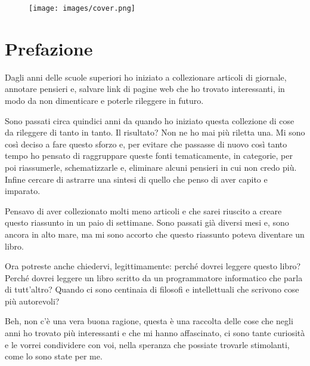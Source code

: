 \documentclass[12pt]{book} %
\date{2024-04-09}
\begin{document}
\begin{figure}[htbp]
    \centering
    \texttt{[image: images/cover.png]}
    \vspace{-\baselineskip} %
\end{figure}


\thispagestyle{empty}
\tableofcontents %
\markboth{}{}    %
\thispagestyle{empty}

\clearpage\section{Prefazione}
Dagli anni delle scuole superiori ho iniziato a collezionare articoli di giornale, annotare pensieri e, salvare link di
pagine web che ho trovato interessanti, in modo da non dimenticare e poterle rileggere in futuro.

Sono passati circa quindici anni da quando ho iniziato questa collezione di cose da rileggere di tanto in tanto. Il
risultato? Non ne ho mai più riletta una. Mi sono così deciso a fare questo sforzo e, per evitare che passasse di
nuovo così tanto tempo ho pensato di raggruppare queste fonti tematicamente, in categorie, per poi riassumerle,
schematizzarle e, eliminare alcuni pensieri in cui non credo più. Infine cercare di astrarre una sintesi di quello che
penso di aver capito e imparato. 

Pensavo di aver collezionato molti meno articoli e che sarei riuscito a creare questo riassunto in un paio di settimane.
Sono passati già diversi mesi e, sono ancora in alto mare, ma mi sono accorto che questo riassunto poteva diventare un
libro.

Ora potreste anche chiedervi, legittimamente: perché dovrei leggere questo libro? Perché dovrei leggere un libro scritto
da un programmatore informatico che parla di tutt'altro? Quando ci sono centinaia di filosofi e
intellettuali che scrivono cose più autorevoli?

Beh, non c'è una vera buona ragione, questa è una raccolta delle cose che negli anni ho trovato più
interessanti e che mi hanno affascinato, ci sono tante curiosità e le vorrei condividere con voi, nella speranza che
possiate trovarle stimolanti, come lo sono state per me.
\end{document}
